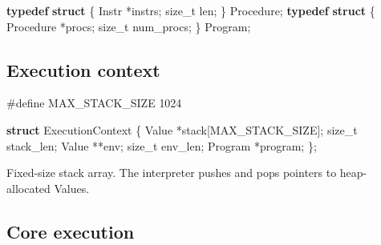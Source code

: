 \documentclass[]{article}
\newenvironment{Shaded}{}{}
\newcommand{\DataTypeTok}[1]{\textcolor[rgb]{0.56,0.13,0.00}{#1}}
\newcommand{\DecValTok}[1]{\textcolor[rgb]{0.25,0.63,0.44}{#1}}
\newcommand{\KeywordTok}[1]{\textcolor[rgb]{0.00,0.44,0.13}{\textbf{#1}}}
\newcommand{\NormalTok}[1]{#1}
\newcommand{\OperatorTok}[1]{\textcolor[rgb]{0.40,0.40,0.40}{#1}}
\newcommand{\PreprocessorTok}[1]{\textcolor[rgb]{0.74,0.48,0.00}{#1}}
\begin{document}
\begin{Shaded}
\begin{Highlighting}[]
\KeywordTok{typedef} \KeywordTok{struct} \OperatorTok{\{}\NormalTok{ Instr }\OperatorTok{*}\NormalTok{instrs}\OperatorTok{;} \DataTypeTok{size\_t}\NormalTok{ len}\OperatorTok{;} \OperatorTok{\}}\NormalTok{ Procedure}\OperatorTok{;}
\KeywordTok{typedef} \KeywordTok{struct} \OperatorTok{\{}\NormalTok{ Procedure }\OperatorTok{*}\NormalTok{procs}\OperatorTok{;} \DataTypeTok{size\_t}\NormalTok{ num\_procs}\OperatorTok{;} \OperatorTok{\}}\NormalTok{ Program}\OperatorTok{;}
\end{Highlighting}
\end{Shaded}

\subsection{Execution context}\label{execution-context}

\begin{Shaded}
\begin{Highlighting}[]
\PreprocessorTok{\#define MAX\_STACK\_SIZE }\DecValTok{1024}

\KeywordTok{struct}\NormalTok{ ExecutionContext }\OperatorTok{\{}
\NormalTok{  Value }\OperatorTok{*}\NormalTok{stack}\OperatorTok{[}\NormalTok{MAX\_STACK\_SIZE}\OperatorTok{];}
  \DataTypeTok{size\_t}\NormalTok{ stack\_len}\OperatorTok{;}
\NormalTok{  Value }\OperatorTok{**}\NormalTok{env}\OperatorTok{;}
  \DataTypeTok{size\_t}\NormalTok{ env\_len}\OperatorTok{;}
\NormalTok{  Program }\OperatorTok{*}\NormalTok{program}\OperatorTok{;}
\OperatorTok{\};}
\end{Highlighting}
\end{Shaded}

Fixed-size stack array. The interpreter pushes and pops pointers to heap-
allocated Values.

\subsection{Core execution}\label{core-execution}
\end{document}
